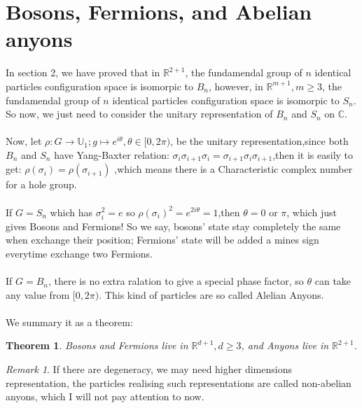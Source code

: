 \documentclass[UTF8]{ctexart}
\newtheorem{theorem}{Theorem}[section]
\theoremstyle{definition}
\theoremstyle{remark}
\newtheorem*{remark}{Remark}
\begin{document}
\section{Bosons, Fermions, and Abelian anyons}
In section 2, we have proved that in $\mathbb{R}^{2+1}$, the fundamendal group of $n$ identical particles configuration space is isomorpic to $B_n$, however, in $\mathbb{R}^{m+1},m\geq 3$, the fundamendal group of $n$ identical particles configuration space is isomorpic to $S_n$. So now, we just need to consider the unitary representation of $B_n$ and $S_n$ on $\mathbb{C}$. \\\\Now, let $\rho: G\rightarrow \mathbb{U}_1; g\mapsto e^{i\theta},\theta\in[0,2\pi)$, be the unitary representation,since both $B_n$ and $S_n$ have Yang-Baxter relation: $	\sigma_i\sigma_{i+1}\sigma_i=\sigma_{i+1}\sigma_i\sigma_{i+1}$,then it is easily to get: $\rho(\sigma_i)=\rho(\sigma_{i+1})$ ,which means there is a Characteristic complex number for a hole group.\\\\
If $G=S_n$ which has $\sigma_i^2=e$ so $\rho(\sigma_i)^2=e^{2i\theta}=1$,then $\theta=0$ or $\pi$, which just gives Bosons and Fermions! So we say, bosons' state stay completely the same when exchange their position; Fermions' state will be added a mines sign everytime exchange two Fermions.\\\\If $G=B_n$, there is no extra ralation to give a special phase factor, so $\theta$ can take any value from $[0,2\pi)$. This kind of particles are so called Alelian Anyons.\\\\We summary it as a theorem:
\begin{theorem}
	Bosons and Fermions live in $\mathbb{R}^{d+1},d\geq 3$, and Anyons live in $\mathbb{R}^{2+1}$.
\end{theorem}
\begin{remark}
	If there are degeneracy, we may need higher dimensions representation, the particles realising such representations are called non-abelian anyons, which I will not pay attention to now.
\end{remark}
\end{document}
